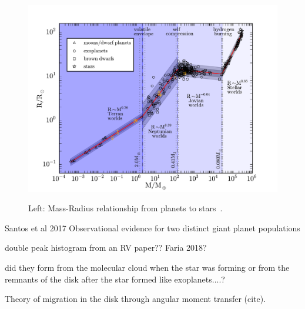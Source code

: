\begin{figure}[t]
    \centering
    \includegraphics[width=0.9\linewidth]{./figures/introduction/mass_radius_relation.pdf}  \\
    \caption{Left: Mass-Radius relationship from planets to stars~\citet{chen_probabilistic_2016}.}
    \label{fig:mass_radius_relation}
\end{figure}


\citep{santos_observational_2017} Santos et al 2017   Observational evidence for two distinct giant planet populations


double peak histogram from an {RV} paper?? Faria 2018?


did they form from the molecular cloud when the star was forming or from the remnants of the disk after the star formed like exoplanets....?


Theory of migration in the disk through  angular moment transfer (cite).

